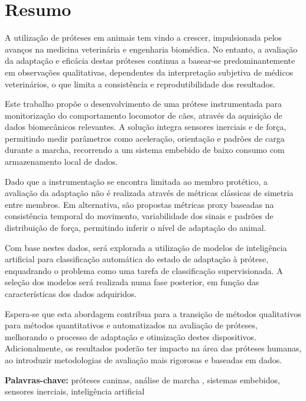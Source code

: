 
\section*{Resumo}


A utilização de próteses em animais tem vindo a crescer, impulsionada pelos avanços na medicina veterinária e engenharia biomédica. No entanto, a avaliação da adaptação e eficácia destas próteses continua a basear-se predominantemente em observações qualitativas, dependentes da interpretação subjetiva de médicos veterinários, o que limita a consistência e reprodutibilidade dos resultados.

Este trabalho propõe o desenvolvimento de uma prótese instrumentada para monitorização do comportamento locomotor de cães, através da aquisição de dados biomecânicos relevantes. A solução integra sensores inerciais e de força, permitindo medir parâmetros como aceleração, orientação e padrões de carga durante a marcha, recorrendo a um sistema embebido de baixo consumo com armazenamento local de dados.

Dado que a instrumentação se encontra limitada ao membro protético, a avaliação da adaptação não é realizada através de métricas clássicas de simetria entre membros. Em alternativa, são propostas métricas proxy baseadas na consistência temporal do movimento, variabilidade dos sinais e padrões de distribuição de força, permitindo inferir o nível de adaptação do animal.

Com base nestes dados, será explorada a utilização de modelos de inteligência artificial para classificação automática do estado de adaptação à prótese, enquadrando o problema como uma tarefa de classificação supervisionada. A seleção dos modelos será realizada numa fase posterior, em função das características dos dados adquiridos.

Espera-se que esta abordagem contribua para a transição de métodos qualitativos para métodos quantitativos e automatizados na avaliação de próteses, melhorando o processo de adaptação e otimização destes dispositivos. Adicionalmente, os resultados poderão ter impacto na área das próteses humanas, ao introduzir metodologias de avaliação mais rigorosas e baseadas em dados.
\vfill

\textbf{\Large Palavras-chave:} próteses caninas, análise de marcha
, sistemas embebidos, sensores inerciais, inteligência artificial
